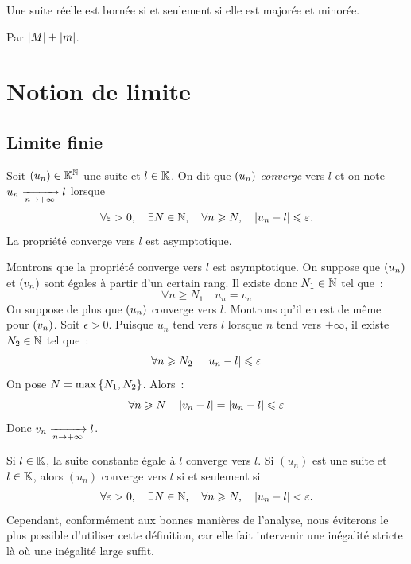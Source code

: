 \documentclass{magnoliaold}
\begin{document}
\begin{proposition}
Une suite réelle est bornée si et seulement si elle est majorée et minorée.
\end{proposition}

\begin{preuve}
Par $\left|M\right|+\left|m\right|$.
\end{preuve}



\section{Notion de limite}

\subsection{Limite finie}

\begin{definition}[utile=-3]
Soit $\left(u_n\right)\in\mathbb{K}^{\mathbb{N}}$ une suite et $l\in\mathbb{K}$. On dit que $\left(u_n\right)$ \emph{converge} vers $l$
et on note $u_n\xrightarrow[n\rightarrow +\infty]{} l$ lorsque
\[\forall \varepsilon>0 ,\quad \exists N\in\mathbb{N} ,\quad \forall n\geqslant N ,\quad
  \left|u_n-l\right|\leqslant\varepsilon.\]
La propriété \og converge vers $l$ \fg est asymptotique.
\end{definition}

\begin{preuve}
Montrons que la propriété \og converge vers $l$ \fg est asymptotique.
On suppose que $\left(u_n\right)$ et $\left(v_n\right)$ sont égales à partir d'un certain rang.
Il existe donc $N_1\in\mathbb{N}$ tel que~:
\[\forall n\geq N_1 \quad u_n=v_n\]
On suppose de plus que $\left(u_n\right)$ converge vers $l$. Montrons qu'il en est de
même pour $\left(v_n\right)$. Soit $\epsilon>0$. Puisque $u_n$ tend vers $l$ lorsque $n$
tend vers $+\infty$, il existe $N_2\in\mathbb{N}$ tel que~:
\[\forall n\geqslant N_2 \quad \left|u_n-l\right|\leqslant\varepsilon\]
On pose $N=\max\left\{N_1,N_2\right\}$. Alors~:
\[\forall n\geqslant N \quad \left|v_n-l\right|=\left|u_n-l\right|\leqslant \varepsilon\]
Donc $v_n\xrightarrow[n\rightarrow +\infty]{} l$.
\end{preuve}

\begin{remarques}
\remarque Si $l\in\mathbb{K}$, la suite constante égale à $l$ converge vers $l$.
\remarque Si $(u_n)$ est une suite et $l\in\mathbb{K}$, alors $(u_n)$ converge vers $l$
  si et seulement si
  \[\forall \varepsilon>0 ,\quad \exists N\in\mathbb{N} ,\quad \forall n\geqslant N ,\quad
    \left|u_n-l\right|<\varepsilon.\]
  Cependant, conformément aux bonnes manières de l'analyse, nous éviterons le plus
  possible d'utiliser cette définition, car elle fait intervenir une
  inégalité stricte là où une inégalité large suffit.
\end{remarques}
\end{document}
